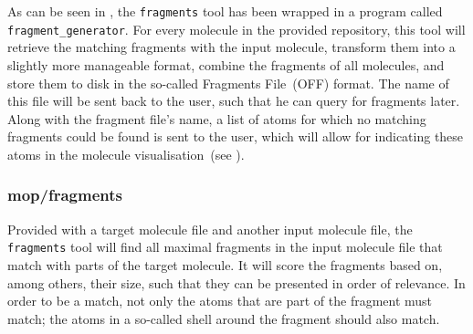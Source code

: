 As can be seen in , the \verb|fragments| tool has been wrapped in a program called \verb|fragment_generator|. For every molecule in the provided repository, this tool will retrieve the matching fragments with the input molecule, transform them into a slightly more manageable format, combine the fragments of all molecules, and store them to disk in the so-called \omfraf{} Fragments File~(OFF) format. The name of this file will be sent back to the \oframp{} user, such that he can query for fragments later. Along with the fragment file's name, a list of atoms for which no matching fragments could be found is sent to the user, which will allow for indicating these atoms in the molecule visualisation~(see ).

\subsubsection{mop/fragments}
Provided with a target molecule file and another input molecule file, the \verb|fragments| tool will find all maximal fragments in the input molecule file that match with parts of the target molecule. It will score the fragments based on, among others, their size, such that they can be presented in order of relevance. In order to be a match, not only the atoms that are part of the fragment must match; the atoms in a so-called shell around the fragment should also match.

